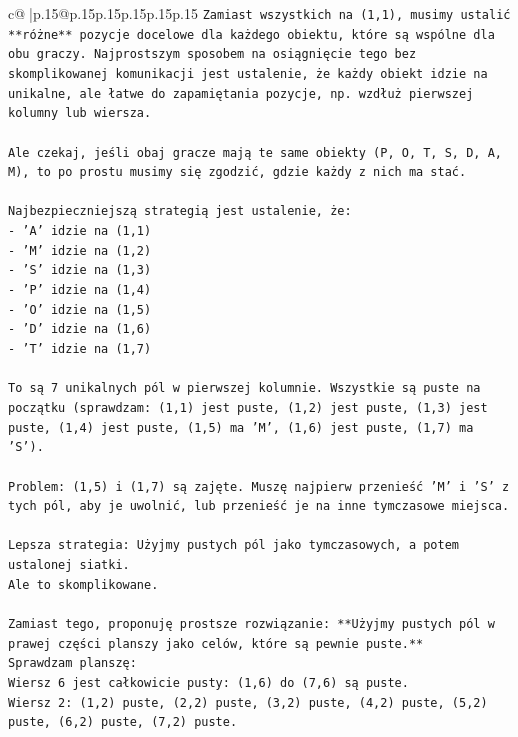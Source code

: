 \documentclass{article}
\begin{document}
{\begin{supertabular}{c@{$\;$}|p{.15\linewidth}@{}p{.15\linewidth}p{.15\linewidth}p{.15\linewidth}p{.15\linewidth}p{.15\linewidth}}
{{{\texttt{Zamiast wszystkich na (1,1), musimy ustalić **różne** pozycje docelowe dla każdego obiektu, które są wspólne dla obu graczy. Najprostszym sposobem na osiągnięcie tego bez skomplikowanej komunikacji jest ustalenie, że każdy obiekt idzie na unikalne, ale łatwe do zapamiętania pozycje, np. wzdłuż pierwszej kolumny lub wiersza.} \\
\\ 
\texttt{Ale czekaj, jeśli obaj gracze mają te same obiekty (P, O, T, S, D, A, M), to po prostu musimy się zgodzić, gdzie każdy z nich ma stać.} \\
\\ 
\texttt{Najbezpieczniejszą strategią jest ustalenie, że:} \\
\texttt{{-} 'A' idzie na (1,1)} \\
\texttt{{-} 'M' idzie na (1,2)} \\
\texttt{{-} 'S' idzie na (1,3)} \\
\texttt{{-} 'P' idzie na (1,4)} \\
\texttt{{-} 'O' idzie na (1,5)} \\
\texttt{{-} 'D' idzie na (1,6)} \\
\texttt{{-} 'T' idzie na (1,7)} \\
\\ 
\texttt{To są 7 unikalnych pól w pierwszej kolumnie. Wszystkie są puste na początku (sprawdzam: (1,1) jest puste, (1,2) jest puste, (1,3) jest puste, (1,4) jest puste, (1,5) ma 'M', (1,6) jest puste, (1,7) ma 'S').} \\
\\ 
\texttt{Problem: (1,5) i (1,7) są zajęte. Muszę najpierw przenieść 'M' i 'S' z tych pól, aby je uwolnić, lub przenieść je na inne tymczasowe miejsca.} \\
\\ 
\texttt{Lepsza strategia: Użyjmy pustych pól jako tymczasowych, a potem ustalonej siatki.} \\
\texttt{Ale to skomplikowane.} \\
\\ 
\texttt{Zamiast tego, proponuję prostsze rozwiązanie: **Użyjmy pustych pól w prawej części planszy jako celów, które są pewnie puste.**} \\
\texttt{Sprawdzam planszę:} \\
\texttt{Wiersz 6 jest całkowicie pusty: (1,6) do (7,6) są puste.} \\
\texttt{Wiersz 2: (1,2) puste, (2,2) puste, (3,2) puste, (4,2) puste, (5,2) puste, (6,2) puste, (7,2) puste.} \\
}}}
\end{supertabular}}
\end{document}
